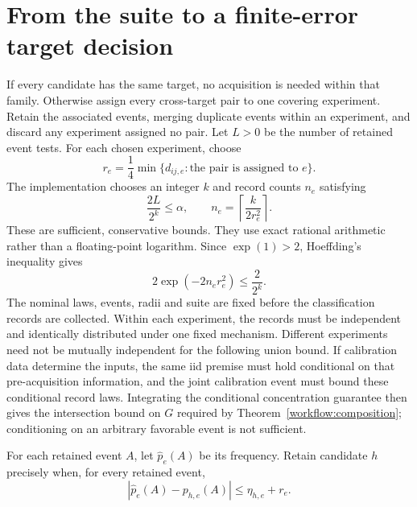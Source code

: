 \section{From the suite to a finite-error target decision}
If every candidate has the same target, no acquisition is needed within that family. Otherwise assign every cross-target pair to one covering experiment. Retain the associated events, merging duplicate events within an experiment, and discard any experiment assigned no pair. Let $L>0$ be the number of retained event tests. For each chosen experiment, choose
\[
 r_e=\frac14\min\{d_{ij,e}:\text{the pair is assigned to }e\}.
\]
The implementation chooses an integer $k$ and record counts $n_e$ satisfying
\[
 \frac{2L}{2^k}\le\alpha,\qquad
 n_e=\left\lceil\frac{k}{2r_e^2}\right\rceil.
\]
These are sufficient, conservative bounds. They use exact rational arithmetic rather than a floating-point logarithm. Since $\exp(1)>2$, Hoeffding's inequality gives
\[
 2\exp(-2n_er_e^2)\le\frac{2}{2^k}.
\]
The nominal laws, events, radii and suite are fixed before the classification records are collected. Within each experiment, the records must be independent and identically distributed under one fixed mechanism. Different experiments need not be mutually independent for the following union bound. If calibration data determine the inputs, the same iid premise must hold conditional on that pre-acquisition information, and the joint calibration event must bound these conditional record laws. Integrating the conditional concentration guarantee then gives the intersection bound on $G$ required by Theorem~\ref{workflow:composition}; conditioning on an arbitrary favorable event is not sufficient.

For each retained event $A$, let $\widehat p_e(A)$ be its frequency. Retain candidate $h$ precisely when, for every retained event,
\[
 |\widehat p_e(A)-p_{h,e}(A)|\le\eta_{h,e}+r_e.
\]


